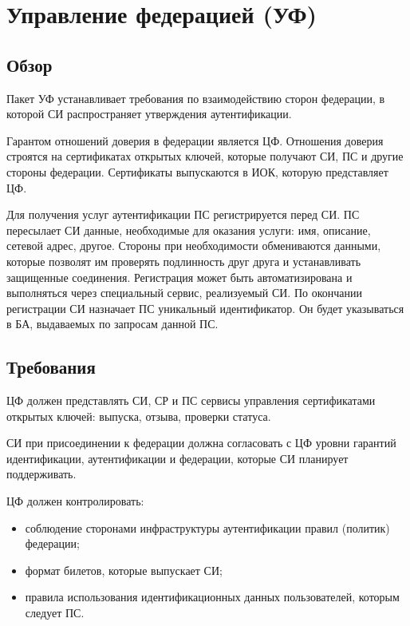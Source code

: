 \section{Управление федерацией (УФ)}\label{FM}

\subsection{Обзор}\label{FM.Intro}

Пакет УФ устанавливает требования по взаимодействию сторон федерации, в которой 
СИ распространяет утверждения аутентификации. 

Гарантом отношений доверия в федерации является ЦФ.
Отношения доверия строятся на сертификатах открытых ключей,
которые получают СИ, ПС и другие стороны федерации.
%
Сертификаты выпускаются в ИОК, которую представляет ЦФ.

Для получения услуг аутентификации ПС регистрируется перед СИ.
%
ПС пересылает СИ данные, необходимые для оказания услуги: имя, описание, сетевой
адрес, другое. Стороны при необходимости обмениваются данными, которые позволят
им проверять подлинность друг друга и устанавливать защищенные соединения.
%
Регистрация может быть автоматизирована и выполняться через специальный сервис,
реализуемый СИ.
%
По окончании регистрации СИ назначает ПС уникальный идентификатор. Он будет 
указываться в БА, выдаваемых по запросам данной ПС.

\subsection{Требования}\label{FM.Reqs}


ЦФ должен представлять СИ, СР и ПС сервисы управления сертификатами открытых 
ключей: выпуска, отзыва, проверки статуса. 

СИ при присоединении к федерации должна согласовать с ЦФ уровни гарантий 
идентификации, аутентификации и федерации, которые СИ планирует поддерживать.

ЦФ должен контролировать:
\begin{itemize}
\item
соблюдение сторонами инфраструктуры аутентификации правил (политик) федерации;
\item
формат билетов, которые выпускает СИ;
\item
правила использования идентификационных данных пользователей, которым следует ПС.
\end{itemize}

